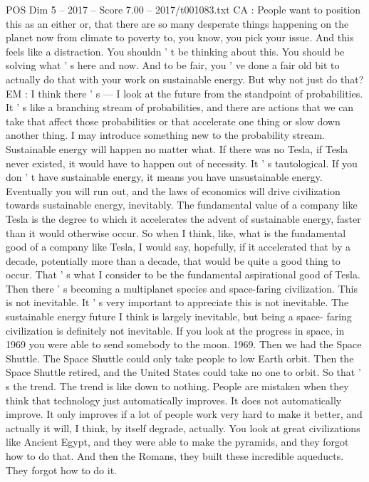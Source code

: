 \begin{textsample}{POS Dim 5 – 2017 – Score 7.00 – 2017/t001083.txt}
CA : People want to position this as an either or, that there are so many desperate things happening on the planet now from climate to poverty to, you know, you pick your issue.
And this feels like a distraction.
You shouldn ' t be thinking about this.
You should be solving what ' s here and now.
And to be fair, you ' ve done a fair old bit to actually do that with your work on sustainable energy.
But why not just do that?
EM : I think there ' s — I look at the future from the standpoint of probabilities.
It ' s like a branching stream of probabilities, and there are actions that we can take that affect those probabilities or that accelerate one thing or slow down another thing.
I may introduce something new to the probability stream.
Sustainable energy will happen no matter what.
If there was no Tesla, if Tesla never existed, it would have to happen out of necessity.
It ' s tautological.
If you don ' t have sustainable energy, it means you have unsustainable energy.
Eventually you will run out, and the laws of economics will drive civilization towards sustainable energy, inevitably.
The fundamental value of a company like Tesla is the degree to which it accelerates the advent of sustainable energy, faster than it would otherwise occur.
So when I think, like, what is the fundamental good of a company like Tesla, I would say, hopefully, if it accelerated that by a decade, potentially more than a decade, that would be quite a good thing to occur.
That ' s what I consider to be the fundamental aspirational good of Tesla.
Then there ' s becoming a multiplanet species and space-faring civilization.
This is not inevitable.
It ' s very important to appreciate this is not inevitable.
The sustainable energy future I think is largely inevitable, but being a space- faring civilization is definitely not inevitable.
If you look at the progress in space, in 1969 you were able to send somebody to the moon. 1969.
Then we had the Space Shuttle.
The Space Shuttle could only take people to low Earth orbit.
Then the Space Shuttle retired, and the United States could take no one to orbit.
So that ' s the trend.
The trend is like down to nothing.
People are mistaken when they think that technology just automatically improves.
It does not automatically improve.
It only improves if a lot of people work very hard to make it better, and actually it will, I think, by itself degrade, actually.
You look at great civilizations like Ancient Egypt, and they were able to make the pyramids, and they forgot how to do that.
And then the Romans, they built these incredible aqueducts.
They forgot how to do it.

\end{textsample}
